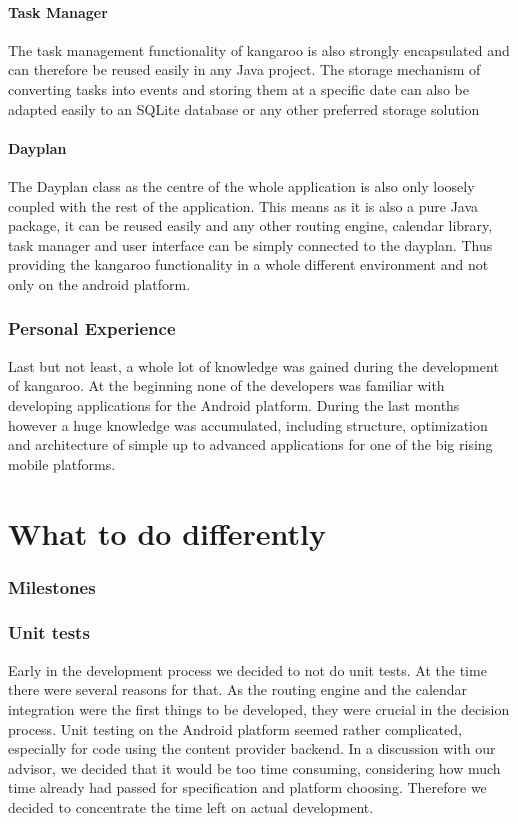 \paragraph{Task Manager}
The task management functionality of kangaroo is also strongly encapsulated and
can therefore be reused easily in any Java project. The storage mechanism of
converting tasks into events and storing them at a specific date can also be
adapted easily to an SQLite database or any other preferred storage solution

\paragraph{Dayplan}
The Dayplan class as the centre of the whole application is also only loosely
coupled with the rest of the application. This means as it is also a pure Java
package, it can be reused easily and any other routing engine, calendar library,
task manager and user interface can be simply connected to the dayplan. Thus
providing the kangaroo functionality in a whole different environment and not
only on the android platform.

\subsubsection{Personal Experience} %
\label{ssub:Personal Experience}
Last but not least, a whole lot of knowledge was gained during the development
of kangaroo. At the beginning none of the developers was familiar with
developing applications for the Android platform. During the last months however
a huge knowledge was accumulated, including structure, optimization and
architecture of simple up to advanced applications for one of the big rising
mobile platforms.


\section{What to do differently} %
\label{sec:Whattododifferently}
\subsubsection{Milestones} %
\label{ssub:Milestones}

\subsubsection{Unit tests} %
\label{ssub:Unittests}
Early in the development process we decided to not do unit tests.
At the time there were several reasons for that.
As the routing engine and the calendar integration were the first
things to be developed, they were crucial in the decision process.
Unit testing on the Android platform seemed rather complicated,
especially for code using the content provider backend. In a discussion
with our advisor, we decided that it would be too time consuming,
considering how much time already had passed for specification and
platform choosing. Therefore we decided to concentrate the time left
on actual development.

